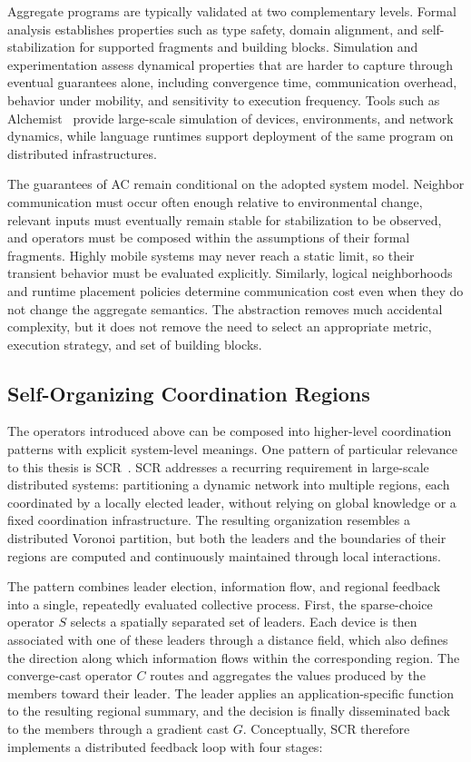 Aggregate programs are typically validated at two complementary levels. 
%
Formal analysis establishes properties such as type safety, domain alignment, 
and self-stabilization for supported fragments and building blocks. 
%
Simulation and experimentation assess dynamical properties that are harder to capture 
 through eventual guarantees alone, including convergence time, communication overhead,
 behavior under mobility, and sensitivity to execution frequency. 
% 
Tools such as Alchemist~\cite{DBLP:journals/jos/PianiniMV13} provide large-scale simulation 
 of devices, environments, and network dynamics, while language runtimes support deployment 
 of the same program on distributed infrastructures.

The guarantees of \gls{AC} remain conditional on the adopted system model. 
%
Neighbor communication must occur often enough relative to environmental change, 
 relevant inputs must eventually remain stable for stabilization to be observed, 
 and operators must be composed within the assumptions of their formal fragments. 
% 
Highly mobile systems may never reach a static limit, 
 so their transient behavior must be evaluated explicitly. 
% 
Similarly, 
 logical neighborhoods and runtime placement policies determine communication cost even
 when they do not change the aggregate semantics. 
%
The abstraction removes much accidental complexity, 
 but it does not remove the need to select an appropriate metric, execution strategy, 
 and set of building blocks.

\subsection{Self-Organizing Coordination Regions}
\label{sec:ac-scr}

The operators introduced above can be composed into higher-level coordination
 patterns with explicit system-level meanings.
%
One pattern of particular relevance to this thesis is
 \gls{SCR}~\cite{DBLP:conf/coordination/CasadeiPVN19}.
%
\gls{SCR} addresses a recurring requirement in large-scale distributed systems:
 partitioning a dynamic network into multiple regions, each coordinated by a
 locally elected leader, without relying on global knowledge or a fixed
 coordination infrastructure.
%
The resulting organization resembles a distributed Voronoi partition, but both
 the leaders and the boundaries of their regions are computed and continuously
 maintained through local interactions.

The pattern combines leader election, information flow, and regional feedback
 into a single, repeatedly evaluated collective process.
%
First, the sparse-choice operator $S$ selects a spatially separated set of
 leaders.
%
Each device is then associated with one of these leaders through a distance
 field, which also defines the direction along which information flows within
 the corresponding region.
%
The converge-cast operator $C$ routes and aggregates the values produced by the
 members toward their leader.
%
The leader applies an application-specific function to the resulting regional
 summary, and the decision is finally disseminated back to the members through
 a gradient cast $G$.
%
Conceptually, \gls{SCR} therefore implements a distributed feedback loop with
 four stages:

